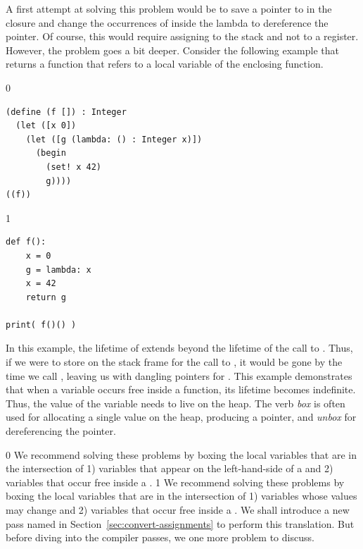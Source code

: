 \documentclass[7x10]{TimesAPriori_MIT}%
\def\racketEd{0}
\def\pythonEd{1}
\def\edition{1}
\begin{document}
A first attempt at solving this problem would be to save a pointer to
 in the closure and change the occurrences of  inside
the lambda to dereference the pointer. Of course, this would require
assigning  to the stack and not to a register. However, the
problem goes a bit deeper.
Consider the following example that returns a function that refers to
a local variable of the enclosing function.
\begin{center}
\begin{minipage}{\textwidth}
{\if\edition\racketEd

\begin{lstlisting}
(define (f []) : Integer
  (let ([x 0])
    (let ([g (lambda: () : Integer x)])
      (begin
        (set! x 42)
        g))))
((f))
\end{lstlisting}
\fi}
{\if\edition\pythonEd
\begin{lstlisting}
def f():
    x = 0
    g = lambda: x
    x = 42
    return g

print( f()() )
\end{lstlisting}
\fi}
\end{minipage}
\end{center}
In this example, the lifetime of  extends beyond the lifetime
of the call to . Thus, if we were to store  on the
stack frame for the call to , it would be gone by the time we
call , leaving us with dangling pointers for
. This example demonstrates that when a variable occurs free
inside a function, its lifetime becomes indefinite. Thus, the value of
the variable needs to live on the heap.  The verb
\emph{box} is often used for allocating a single
value on the heap, producing a pointer, and
\emph{unbox} for dereferencing the pointer.

{\if\edition\racketEd
We recommend solving these problems by boxing the local variables that
are in the intersection of 1) variables that appear on the
left-hand-side of a   and 2) variables that occur free
inside a .
\fi}
{\if\edition\pythonEd
We recommend solving these problems by boxing the local variables that
are in the intersection of 1) variables whose values may change and 2)
variables that occur free inside a .
\fi}
We shall introduce a new pass named
 in Section~\ref{sec:convert-assignments}
to perform this translation. But before diving into the compiler
passes, we one more problem to discuss.
\end{document}
